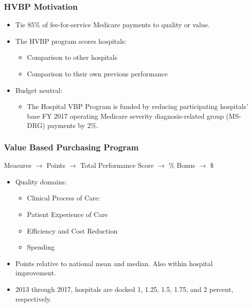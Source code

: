 \documentclass[ucs,9pt]{beamer}
\begin{document}
\begin{frame}
\frametitle{HVBP Motivation}
\begin{itemize}
\item Tie 85$\%$ of fee-for-service Medicare payments to quality or value.
\item The HVBP program scores hospitals:
\begin{itemize}
\item Comparison to other hospitals
\item Comparison to their own previous performance
\end{itemize}
\item Budget neutral:
\begin{itemize}
\item The Hospital VBP Program is funded by reducing participating hospitals' base FY 2017 operating Medicare severity diagnosis-related group (MS-DRG) payments by 2$\%$.
\end{itemize}
\end{itemize}
\end{frame}





\begin{frame}
\frametitle{Value Based Purchasing Program}
Measures $\rightarrow$ Points $\rightarrow$ Total Performance Score $\rightarrow$ $\%$ Bonus $\rightarrow$ $\$$
\pause
\begin{itemize}
\item Quality domains:
\begin{itemize}
\item Clinical Process of Care: 
\item Patient Experience of Care
\item Efficiency and Cost Reduction
\item Spending
\end{itemize}

\item Points relative to national mean and median.  Also within hospital improvement.
\item 2013 through 2017, hospitals are docked 1, 1.25, 1.5, 1.75, and 2 percent, respectively.  
\end{itemize}
\end{frame}
\end{document}
